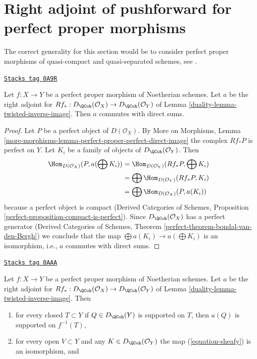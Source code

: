 \section{Right adjoint of pushforward for perfect proper morphisms}
\label{duality-section-perfect-proper}
The correct generality for this section would be to consider
perfect proper morphisms of quasi-compact and quasi-separated
schemes, see \cite{LN}.

\begin{lemma}
\label{duality-lemma-proper-flat-noetherian}
\href{https://stacks.math.columbia.edu/tag/0A9R}{\texttt{Stacks tag 0A9R}}

Let $f : X \to Y$ be a perfect proper morphism of Noetherian schemes.
Let $a$ be the right adjoint for
$Rf_* : D_\QCoh(\mathcal{O}_X) \to D_\QCoh(\mathcal{O}_Y)$ of
Lemma \ref{duality-lemma-twisted-inverse-image}. Then $a$ commutes with direct sums.
\end{lemma}

\begin{proof}
Let $P$ be a perfect object of $D(\mathcal{O}_X)$. By
More on Morphisms, Lemma
\ref{more-morphisms-lemma-perfect-proper-perfect-direct-image}
the complex $Rf_*P$ is perfect on $Y$.
Let $K_i$ be a family of objects of $D_\QCoh(\mathcal{O}_Y)$.
Then
\begin{align*}
\Hom_{D(\mathcal{O}_X)}(P, a(\bigoplus K_i))
& =
\Hom_{D(\mathcal{O}_Y)}(Rf_*P, \bigoplus K_i) \\
& =
\bigoplus \Hom_{D(\mathcal{O}_Y)}(Rf_*P, K_i) \\
& =
\bigoplus \Hom_{D(\mathcal{O}_X)}(P, a(K_i))
\end{align*}
because a perfect object is compact (Derived Categories of Schemes,
Proposition \ref{perfect-proposition-compact-is-perfect}).
Since $D_\QCoh(\mathcal{O}_X)$ has a perfect generator
(Derived Categories of Schemes, Theorem
\ref{perfect-theorem-bondal-van-den-Bergh})
we conclude that the map $\bigoplus a(K_i) \to a(\bigoplus K_i)$
is an isomorphism, i.e., $a$ commutes with direct sums.
\end{proof}

\begin{lemma}
\label{duality-lemma-proper-flat-noetherian-relative}
\href{https://stacks.math.columbia.edu/tag/0AAA}{\texttt{Stacks tag 0AAA}}

Let $f : X \to Y$ be a perfect proper morphism of Noetherian schemes.
Let $a$ be the right adjoint for
$Rf_* : D_\QCoh(\mathcal{O}_X) \to D_\QCoh(\mathcal{O}_Y)$ of
Lemma \ref{duality-lemma-twisted-inverse-image}. Then
\begin{enumerate}
\item for every closed $T \subset Y$ if $Q \in D_\QCoh(Y)$ is supported on $T$,
then $a(Q)$ is supported on $f^{-1}(T)$,
\item for every open $V \subset Y$ and any $K \in D_\QCoh(\mathcal{O}_Y)$
the map (\ref{equation-sheafy}) is an isomorphism, and
\end{enumerate}
\end{lemma}

